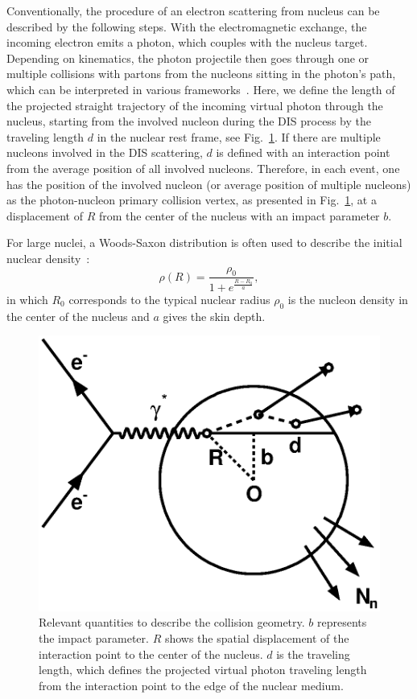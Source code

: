 Conventionally, the procedure of an electron scattering from nucleus can be
described by the following steps. With the electromagnetic exchange, the
incoming electron emits a photon, which couples with the nucleus target.
Depending on kinematics, the photon projectile then goes through one or multiple
collisions with partons from the nucleons sitting in the photon's path, which
can be interpreted in various frameworks~\cite{Piller:1995kh}. Here, we define
the length of the projected straight trajectory of the incoming virtual photon
through the nucleus, starting from the involved nucleon during the DIS process
by the traveling length $d$ in the nuclear rest frame, see
Fig.~\ref{fig:geometry}. If there are multiple nucleons involved in the DIS
scattering, $d$ is defined with an interaction point from the average position
of all involved nucleons. Therefore, in each event, one has the position of the
involved nucleon (or average position of multiple nucleons) as the
photon-nucleon primary collision vertex, as presented in
Fig.~\ref{fig:geometry}, at a displacement of $R$ from the center of the nucleus
with an impact parameter $b$.

For large nuclei, a Woods-Saxon distribution is often used to describe the 
initial nuclear density~\cite{Miller:2007ri}:
\begin{equation}
\rho(R)=\frac{\rho_{0}}{1+e^{\frac{R-R_{0}}{a}}},
\label{eqn:woodsaxon}
\end{equation}
in which $R_{0}$ corresponds to the typical nuclear radius $\rho_{0}$ is the nucleon density in the center of the nucleus and $a$ gives the skin depth.

\begin{figure}
\begin{center}
\includegraphics[width=0.5\columnwidth]{plots/chpt7/geometry_definition.eps}
\caption[A schematic view of the \eA\ collision and the relevant geometric quantity definition] {Relevant quantities to describe the collision geometry. $b$ represents the impact parameter. $R$ shows the spatial displacement of the interaction point to the center of the nucleus. $d$ is the traveling length, which defines the projected virtual photon traveling length from the interaction point to the edge of the nuclear medium.}
\label{fig:geometry}
\end{center}
\end{figure}

